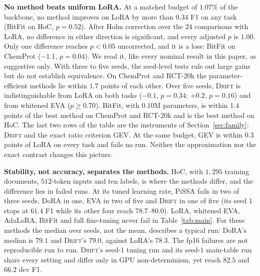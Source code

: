 \documentclass[conference,onecolumn]{IEEEtran}
\newcommand{\method}{\textsc{Drift}}
\begin{document}
\noindent\textbf{No method beats uniform LoRA.} At a matched budget of
$1.07\%$ of the backbone, no method improves on LoRA by more than $0.34$ F1 on
any task (BitFit on HoC, $p = 0.52$). After Holm correction over the $24$
comparisons with LoRA, no difference in either direction is significant, and
every adjusted $p$ is $1.00$. Only one difference reaches $p < 0.05$
uncorrected, and it is a loss: BitFit on ChemProt ($-1.1$, $p = 0.04$). We read
it, like every nominal result in this paper, as suggestive only. With three to
five seeds, the seed-level tests rule out large gains but do not establish
equivalence. On
ChemProt and RCT-20k the parameter-efficient methods lie within $1.7$ points of
each other. Over five seeds, \method{} is indistinguishable from LoRA on both
tasks ($-0.1$, $p = 0.34$; $+0.2$, $p = 0.16$) and from whitened EVA
($p \ge 0.70$). BitFit, with $0.10$M parameters, is within $1.4$ points of the
best method on ChemProt and RCT-20k and is the best method on HoC. The last two
rows of the table are the instruments of Section~\ref{sec:family}: \method{} and
the exact ratio criterion GEV. At the same budget, GEV is within $0.3$ points of
LoRA on every task and fails no run. Neither the approximation nor the exact
contrast changes this picture.


\noindent\textbf{Stability, not accuracy, separates the methods.} HoC, with
$1{,}295$ training documents, $512$-token inputs and ten labels, is where the
methods differ, and the difference lies in failed runs. At its tuned learning
rate, PiSSA fails in two of three seeds, DoRA in one, EVA in two of five and
\method{} in one of five (its seed $1$ stops at $61.4$ F1 while its other four
reach $78.7$--$80.0$). LoRA, whitened EVA, AdaLoRA, BitFit and full fine-tuning
never fail in Table~\ref{tab:main}. For these methods the median over seeds, not
the mean, describes a typical run: DoRA's median is $79.1$ and \method{}'s
$79.0$, against LoRA's $78.3$. The fp16 failures are not reproducible run to
run. \method{}'s seed-$1$ tuning run and its seed-$1$ main-table run share every
setting and differ only in GPU non-determinism, yet reach $82.5$ and $66.2$ dev
F1.
\end{document}
